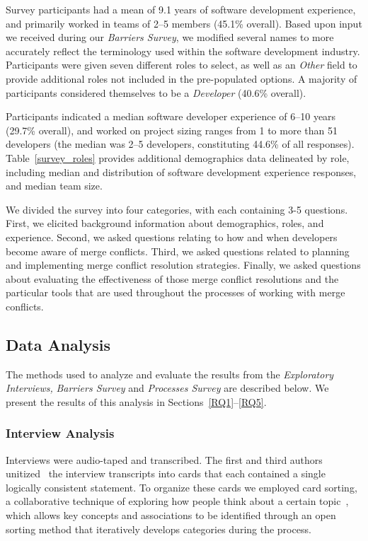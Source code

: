 Survey participants had a mean of 9.1 years of software development experience, and primarily worked in teams of 2--5 members (45.1\% overall).
Based upon input we received during our \textit{Barriers Survey}, we modified several names to more accurately reflect the terminology used within the software development industry.
Participants were given seven different roles to select, as well as an \textit{Other} field to provide additional roles not included in the pre-populated options.
A majority of participants considered themselves to be a \textit{Developer} (40.6\% overall).

Participants indicated a median software developer experience of 6--10 years (29.7\% overall), and worked on project sizing ranges from 1 to more than 51 developers (the median was 2--5 developers, constituting 44.6\% of all responses).
Table~\ref{survey_roles} provides additional demographics data delineated by role, including median and distribution of software development experience responses, and median team size.

We divided the survey into four categories, with each containing 3-5 questions.
First, we elicited background information about demographics, roles, and experience.
Second, we asked questions relating to how and when developers become aware of merge conflicts.
Third, we asked questions related to planning and implementing merge conflict resolution strategies.
Finally, we asked questions about evaluating the effectiveness of those merge conflict resolutions and the particular tools that are used throughout the processes of working with merge conflicts.

\subsection{Data Analysis}\label{analysis}

The methods used to analyze and evaluate the results from the \textit{Exploratory Interviews,} \textit{Barriers Survey} and \textit{Processes Survey} are described below.
We present the results of this analysis in Sections~\ref{RQ1}--\ref{RQ5}.

\subsubsection{Interview Analysis}

Interviews were audio-taped and transcribed. 
The first and third authors unitized~\cite{unitization} the interview transcripts into cards that each contained a single logically consistent statement. 
To organize these cards we employed card sorting, a collaborative technique of exploring how people think about a certain topic~\cite{spencer2009card,card_sort}, which allows key concepts and associations to be identified through an open sorting method that iteratively develops categories during the process.

